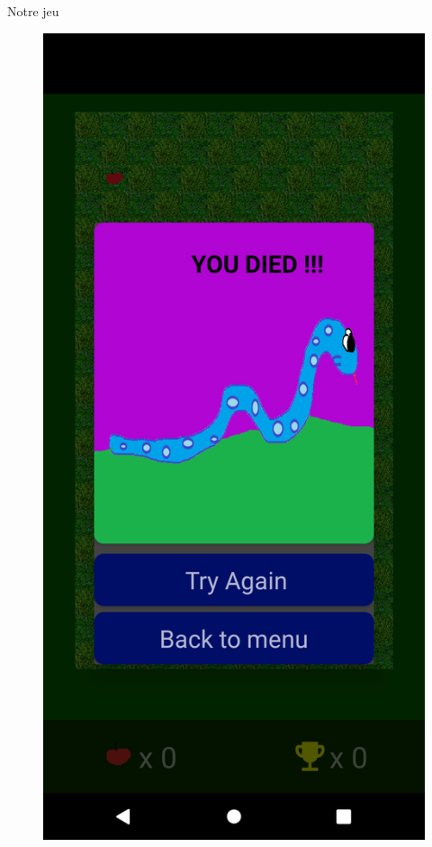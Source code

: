 \documentclass{beamer}
\begin{document}
\begin{frame}{Notre jeu}
\begin{figure}[H]
\begin{minipage}[H]{0.25\linewidth}
    \end{minipage}\hfill
    \begin{minipage}[H]{0.25\linewidth}
        \centering
        \includegraphics[scale=0.05]{MenuEnJeu.png}

\end{minipage}
\end{figure}
\end{frame}
\end{document}
